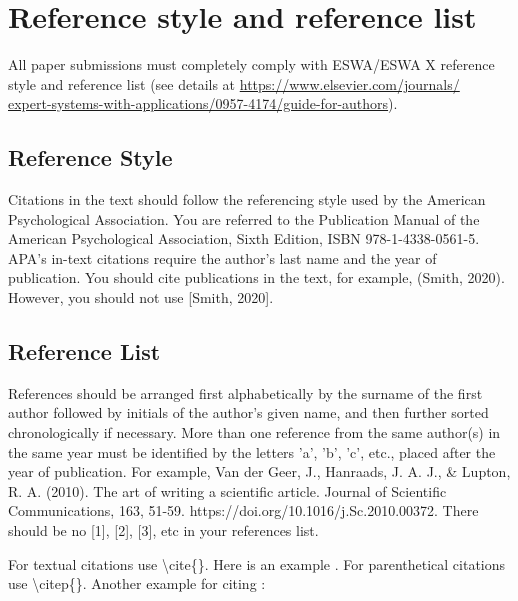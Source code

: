 

\section{Reference style and reference list}
\label{reference_style}

All paper submissions must completely comply with ESWA/ESWA X reference style and reference list (see details at
\href{https://www.elsevier.com/journals/expert-systems-with-applications/0957-4174/guide-for-authors}{https://www.elsevier.com/journals/\\expert-systems-with-applications/0957-4174/guide-for-authors}).

\subsection{Reference Style}
Citations in the text should follow the referencing style used by the American Psychological Association. You are referred to the Publication Manual of the American Psychological Association, Sixth Edition, ISBN 978-1-4338-0561-5.  APA's in-text citations require the author's last name and the year of publication. You should cite publications in the text, for example, (Smith, 2020).  However, you should not use [Smith, 2020].

\subsection{Reference List}
References should be arranged first alphabetically by the surname of the first author followed by initials of the author's given name, and then further sorted chronologically if necessary. More than one reference from the same author(s) in the same year must be identified by the letters 'a', 'b', 'c', etc., placed after the year of publication. For example, Van der Geer, J., Hanraads, J. A. J., \& Lupton, R. A. (2010). The art of writing a scientific article. Journal of Scientific Communications, 163, 51-59. https://doi.org/10.1016/j.Sc.2010.00372. There should be no [1], [2], [3], etc in your references list.


For textual citations use \textbackslash cite\{\}. Here is an example \cite{Feynman1963118,Dirac1953888}. For parenthetical citations use \textbackslash citep\{\}. Another example for citing \citep{Smith2012qr,Smith2013jd,art}: 
